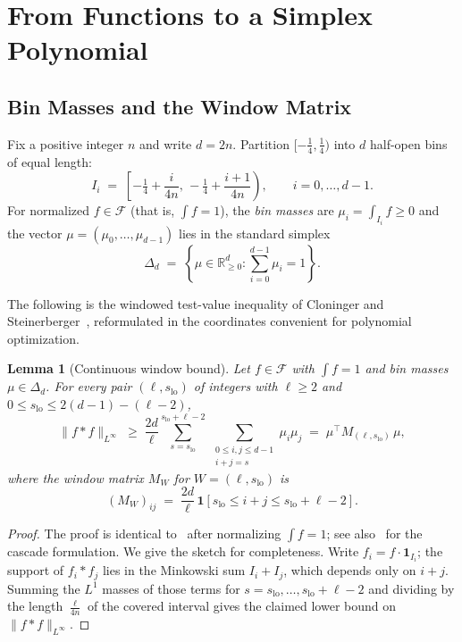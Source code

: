 \documentclass[11pt, letterpaper]{article}
\theoremstyle{paperplain}
\newtheorem{lemma}[theorem]{Lemma}
\theoremstyle{paperdef}
\newcommand{\R}{\mathbb{R}}
\begin{document}
\section{From Functions to a Simplex Polynomial}\label{sec:reduction}

\subsection{Bin Masses and the Window Matrix}

Fix a positive integer $n$ and write $d=2n$.  Partition
$[-\tfrac14,\tfrac14)$ into $d$ half-open bins of equal length:
\[
  I_i
  \;=\;
  \left[-\tfrac14 + \frac{i}{4n},\,
        -\tfrac14 + \frac{i+1}{4n}\right),
  \qquad i=0,\dots,d-1.
\]
For normalized $f\in\mathcal{F}$ (that is, $\int f=1$), the
\emph{bin masses} are $\mu_i = \int_{I_i} f \ge 0$ and the vector
$\mu=(\mu_0,\ldots,\mu_{d-1})$ lies in the standard simplex
\[
  \Delta_d \;=\; \left\{\mu \in \R_{\ge 0}^d : \sum_{i=0}^{d-1}\mu_i = 1\right\}.
\]

The following is the windowed test-value inequality of Cloninger and
Steinerberger~\cite[Lemma~1]{CS17}, reformulated in the coordinates
convenient for polynomial optimization.

\begin{lemma}[Continuous window bound]
\label{lem:continuous-window}
Let $f\in\mathcal{F}$ with $\int f=1$ and bin masses
$\mu\in\Delta_d$.  For every pair $(\ell,s_{\mathrm{lo}})$ of
integers with $\ell\ge 2$ and $0\le s_{\mathrm{lo}}\le 2(d-1)-(\ell-2)$,
\[
  \|f*f\|_{L^\infty}
  \;\ge\;
  \frac{2d}{\ell}
  \sum_{s=s_{\mathrm{lo}}}^{s_{\mathrm{lo}}+\ell-2}
  \ \sum_{\substack{0\le i,j\le d-1\\ i+j=s}}
  \mu_i\mu_j
  \;=\;
  \mu^\top M_{(\ell,s_{\mathrm{lo}})}\, \mu,
\]
where the window matrix $M_W$ for $W=(\ell,s_{\mathrm{lo}})$ is
\[
  (M_W)_{ij}
  \;=\;
  \frac{2d}{\ell}\,
  \mathbf{1}\!\left[s_{\mathrm{lo}}\le i+j\le s_{\mathrm{lo}}+\ell-2\right].
\]
\end{lemma}

\begin{proof}
The proof is identical to~\cite[Lemma~1]{CS17} after normalizing
$\int f = 1$; see also~\cite[Lemma~2.3]{BajajCS2026}
for the cascade formulation.  We give the sketch for completeness.
Write $f_i=f\cdot\mathbf{1}_{I_i}$; the support of $f_i*f_j$ lies in the
Minkowski sum $I_i+I_j$, which depends only on $i+j$.  Summing the
$L^1$ masses of those terms for $s=s_{\mathrm{lo}},\ldots,s_{\mathrm{lo}}+\ell-2$
and dividing by the length $\tfrac{\ell}{4n}$ of the covered interval
gives the claimed lower bound on $\|f*f\|_{L^\infty}$.
\end{proof}
\end{document}
